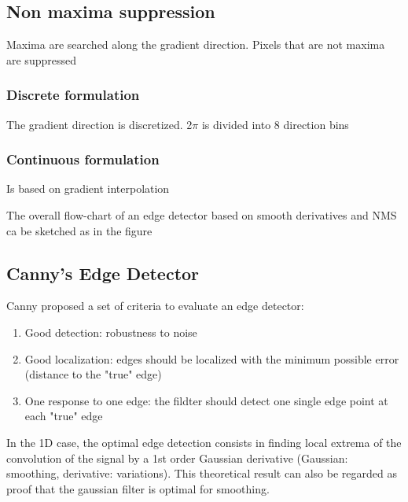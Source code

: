 \documentclass{article}
\begin{document}
\subsection{Non maxima suppression}
Maxima are searched along the gradient direction. Pixels that are not maxima are suppressed
\subsubsection{Discrete formulation}
The gradient direction is discretized. 2$\pi$ is divided into 8 direction bins 
\subsubsection{Continuous formulation}
Is based on gradient interpolation

The overall flow-chart of an edge detector based on smooth derivatives and NMS ca be sketched as in the figure 
\subsection{Canny's Edge Detector}
Canny proposed a set of criteria to evaluate an edge detector:
\begin{enumerate}
    \item Good detection: robustness to noise
    \item Good localization: edges should be localized with the minimum possible error (distance to the "true" edge)
    \item One response to one edge: the fildter should detect one single edge point at each "true" edge
\end{enumerate}
In the 1D case, the optimal edge detection consists in finding local extrema of the convolution of the signal by a 1st order Gaussian derivative (Gaussian: smoothing, derivative: variations). This theoretical result can also be regarded as proof that the gaussian filter is optimal for smoothing. 
\end{document}
